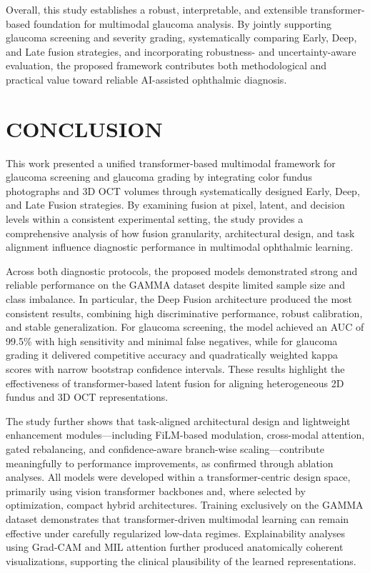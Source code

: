\documentclass[preprint,12pt]{elsarticle}
\begin{document}
Overall, this study establishes a robust, interpretable, and extensible transformer-based foundation for multimodal glaucoma analysis. By jointly supporting glaucoma screening and severity grading, systematically comparing Early, Deep, and Late fusion strategies, and incorporating robustness- and uncertainty-aware evaluation, the proposed framework contributes both methodological and practical value toward reliable AI-assisted ophthalmic diagnosis.

\section{CONCLUSION}

This work presented a unified transformer-based multimodal framework for glaucoma screening and glaucoma grading by integrating color fundus photographs and 3D OCT volumes through systematically designed Early, Deep, and Late Fusion strategies. By examining fusion at pixel, latent, and decision levels within a consistent experimental setting, the study provides a comprehensive analysis of how fusion granularity, architectural design, and task alignment influence diagnostic performance in multimodal ophthalmic learning.

Across both diagnostic protocols, the proposed models demonstrated strong and reliable performance on the GAMMA dataset despite limited sample size and class imbalance. In particular, the Deep Fusion architecture produced the most consistent results, combining high discriminative performance, robust calibration, and stable generalization. For glaucoma screening, the model achieved an AUC of 99.5\% with high sensitivity and minimal false negatives, while for glaucoma grading it delivered competitive accuracy and quadratically weighted kappa scores with narrow bootstrap confidence intervals. These results highlight the effectiveness of transformer-based latent fusion for aligning heterogeneous 2D fundus and 3D OCT representations.

The study further shows that task-aligned architectural design and lightweight enhancement modules—including FiLM-based modulation, cross-modal attention, gated rebalancing, and confidence-aware branch-wise scaling—contribute meaningfully to performance improvements, as confirmed through ablation analyses. All models were developed within a transformer-centric design space, primarily using vision transformer backbones and, where selected by optimization, compact hybrid architectures. Training exclusively on the GAMMA dataset demonstrates that transformer-driven multimodal learning can remain effective under carefully regularized low-data regimes. Explainability analyses using Grad-CAM and MIL attention further produced anatomically coherent visualizations, supporting the clinical plausibility of the learned representations.
\end{document}
